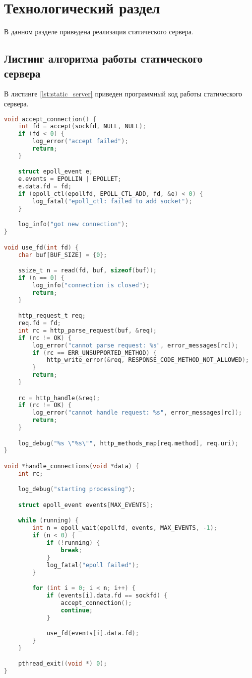 \chapter{Технологический раздел}

В данном разделе приведена реализация статического сервера.

\section{Листинг алгоритма работы статического \\ сервера}

В листинге \ref{lst:static_server} приведен программный код работы статического сервера.
 
\begin{lstlisting}[language=C, label=lst:static_server, caption={Листинг алгоритма работы статического сервера}]
void accept_connection() {
    int fd = accept(sockfd, NULL, NULL);
    if (fd < 0) {
        log_error("accept failed");
        return;
    }

    struct epoll_event e;
    e.events = EPOLLIN | EPOLLET;
    e.data.fd = fd;
    if (epoll_ctl(epollfd, EPOLL_CTL_ADD, fd, &e) < 0) {
        log_fatal("epoll_ctl: failed to add socket");
    }

    log_info("got new connection");
}

void use_fd(int fd) {
    char buf[BUF_SIZE] = {0};

    ssize_t n = read(fd, buf, sizeof(buf));
    if (n == 0) {
        log_info("connection is closed");
        return;
    }

    http_request_t req;
    req.fd = fd;
    int rc = http_parse_request(buf, &req);
    if (rc != OK) {
        log_error("cannot parse request: %s", error_messages[rc]);
        if (rc == ERR_UNSUPPORTED_METHOD) {
            http_write_error(&req, RESPONSE_CODE_METHOD_NOT_ALLOWED);
        }
        return;
    }

    rc = http_handle(&req);
    if (rc != OK) {
        log_error("cannot handle request: %s", error_messages[rc]);
        return;
    }

    log_debug("%s \"%s\"", http_methods_map[req.method], req.uri);
}

void *handle_connections(void *data) {
    int rc;

    log_debug("starting processing");

    struct epoll_event events[MAX_EVENTS];

    while (running) {
        int n = epoll_wait(epollfd, events, MAX_EVENTS, -1);
        if (n < 0) {
            if (!running) {
                break;
            }
            log_fatal("epoll failed");
        }

        for (int i = 0; i < n; i++) {
            if (events[i].data.fd == sockfd) {
                accept_connection();
                continue;
            }

            use_fd(events[i].data.fd);
        }
    }

    pthread_exit((void *) 0);
}
\end{lstlisting}
